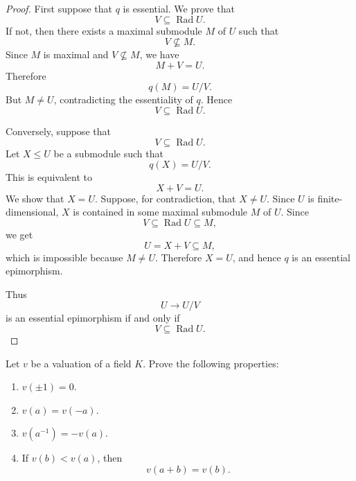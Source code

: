\begin{proof}
    First suppose that \(q\) is essential. We prove that
    \[
    V\subseteq \operatorname{Rad}U.
    \]
    If not, then there exists a maximal submodule \(M\) of \(U\) such that
    \[
    V\nsubseteq M.
    \]
    Since \(M\) is maximal and \(V\nsubseteq M\), we have
    \[
    M+V=U.
    \]
    Therefore
    \[
    q(M)=U/V.
    \]
    But \(M\neq U\), contradicting the essentiality of \(q\). Hence
    \[
    V\subseteq \operatorname{Rad}U.
    \]
    
    Conversely, suppose that
    \[
    V\subseteq \operatorname{Rad}U.
    \]
    Let \(X\leq U\) be a submodule such that
    \[
    q(X)=U/V.
    \]
    This is equivalent to
    \[
    X+V=U.
    \]
    We show that \(X=U\). Suppose, for contradiction, that \(X\neq U\). Since \(U\) is
    finite-dimensional, \(X\) is contained in some maximal submodule \(M\) of \(U\). Since
    \[
    V\subseteq \operatorname{Rad}U\subseteq M,
    \]
    we get
    \[
    U=X+V\subseteq M,
    \]
    which is impossible because \(M\neq U\). Therefore \(X=U\), and hence \(q\) is an
    essential epimorphism.
    
    Thus
    \[
    U\longrightarrow U/V
    \]
    is an essential epimorphism if and only if
    \[
    V\subseteq \operatorname{Rad}U.
    \]
    \end{proof}
    
    
    \begin{exercise}
    Let \(v\) be a valuation of a field \(K\). Prove the following properties:
    \begin{enumerate}
        \item[(i)] \(v(\pm 1)=0\).
        \item[(ii)] \(v(a)=v(-a)\).
        \item[(iii)] \(v(a^{-1})=-v(a)\).
        \item[(iv)] If \(v(b)<v(a)\), then
        \[
        v(a+b)=v(b).
        \]
    \end{enumerate}
    \end{exercise}
    
